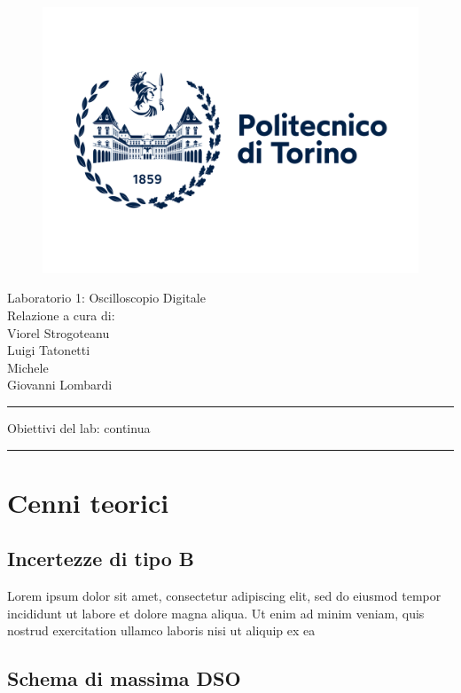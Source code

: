 \documentclass{article}
\begin{document}
\begin{figure}[!t]
    \centering
     \includegraphics[width=\textwidth]{polito_logo_2021_blu.jpeg}
     \label{fig:logo_polito}
\end{figure}
\begin{center}
    \huge{Laboratorio 1: Oscilloscopio Digitale}\\[10pt]
    \large{Relazione a cura di:
    \\Viorel Strogoteanu\\Luigi Tatonetti\\Michele\\Giovanni Lombardi}
\end{center}


\rule{\textwidth}{0.5pt}


    \noindent Obiettivi del lab: continua\\
\rule{\textwidth}{0.5pt}

\section{Cenni teorici}
    \subsection{Incertezze di tipo B}
        Lorem ipsum dolor sit amet, consectetur adipiscing elit, sed do eiusmod tempor incididunt ut labore et dolore magna aliqua. Ut enim ad minim veniam, quis nostrud exercitation ullamco laboris nisi ut aliquip ex ea
    \subsection{Schema di massima DSO}
\end{document}
